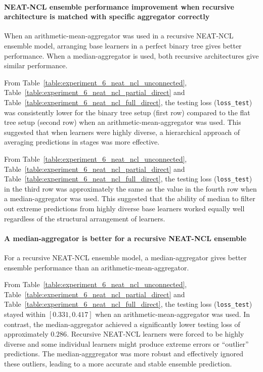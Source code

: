\paragraph{NEAT-NCL ensemble performance improvement when recursive architecture is matched with specific aggregator correctly}
When an arithmetic-mean-aggregator was used in a recursive NEAT-NCL ensemble model, arranging base learners in a perfect binary tree gives better performance. When a median-aggregator is used, both recursive architectures give similar performance. 

From Table~\ref{table:experiment_6_neat_ncl_unconnected}, Table~\ref{table:experiment_6_neat_ncl_partial_direct} and Table~\ref{table:experiment_6_neat_ncl_full_direct}, the testing loss (\texttt{loss\_test}) was consistently lower for the binary tree setup (first row) compared to the flat tree setup (second row) when an arithmetic-mean-aggregator was used. This suggested that when learners were highly diverse, a hierarchical approach of averaging predictions in stages was more effective. 

From Table~\ref{table:experiment_6_neat_ncl_unconnected}, Table~\ref{table:experiment_6_neat_ncl_partial_direct} and Table~\ref{table:experiment_6_neat_ncl_full_direct}, the testing loss (\texttt{loss\_test}) in the third row was approximately the same as the value in the fourth row when a median-aggregator was used. This suggested that the ability of median to filter out extreme predictions from highly diverse base learners worked equally well regardless of the structural arrangement of learners. 

\paragraph{A median-aggregator is better for a recursive NEAT-NCL ensemble}
For a recursive NEAT-NCL ensemble model, a median-aggregator gives better ensemble performance than an arithmetic-mean-aggregator. 

From Table~\ref{table:experiment_6_neat_ncl_unconnected}, Table~\ref{table:experiment_6_neat_ncl_partial_direct} and Table~\ref{table:experiment_6_neat_ncl_full_direct}, the testing loss (\texttt{loss\_test}) stayed within $[0.331, 0.417]$ when an arithmetic-mean-aggregator was used. In contrast, the median-aggregator achieved a significantly lower testing loss of approximately $0.286$. Recursive NEAT-NCL learners were forced to be highly diverse and some individual learners might produce extreme errors or ``outlier'' predictions. The median-agggregator was more robust and effectively ignored these outliers, leading to a more accurate and stable ensemble prediction. 

